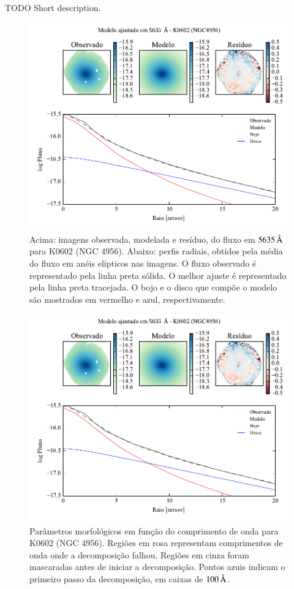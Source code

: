 TODO Short description.

\begin{figure}
	\includegraphics[page=1]{figuras-decomp/K0602_sample006a}
	\caption[Ajuste morfológico em $5635\,\angstrom$ de K0602 (NGC 4956)]
	{Acima: imagens observada, modelada e resíduo, do fluxo em $5635\,\angstrom$
	para K0602 (NGC 4956). Abaixo: perfis radiais, obtidos pela média do fluxo em
	anéis elípticos nas imagens. O fluxo observado é representado pela linha preta
	sólida. O melhor ajuste é representado pela linha preta tracejada. O bojo e o
	disco que compõe o modelo são mostrados em vermelho e azul, respectivamente.}
	\label{fig:decompRadprof:K0602}
\end{figure}

\begin{figure}
	\includegraphics[page=2]{figuras-decomp/K0602_sample006a}
	\caption[Parâmetros morfológicos em função do comprimento de onda de K0602
	(NGC 4956)]
	{Parâmetros morfológicos em função do comprimento de onda para
	K0602 (NGC 4956). Regiões em rosa representam comprimentos de onda onde a
	decomposição falhou. Regiões em cinza foram mascaradas antes de iniciar a
	decomposição. Pontos azuis indicam o primeiro passo da decomposição, em caixas
	de $100\,\text{\normalfont\AA}$.}
	\label{fig:decompParams:K0602}
\end{figure}

